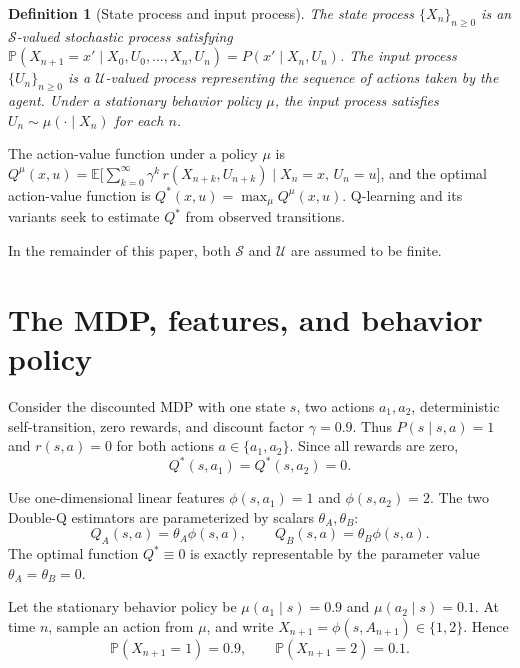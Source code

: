 \documentclass[11pt]{article}
\newtheorem{definition}{Definition}
\begin{document}
\begin{definition}[State process and input process]
The \textit{state process} $\{X_n\}_{n \geq 0}$ is an $\mathcal{S}$-valued stochastic process satisfying $\mathbb{P}(X_{n+1} = x' \mid X_0, U_0, \ldots, X_n, U_n) = P(x' \mid X_n, U_n)$. The \textit{input process} $\{U_n\}_{n \geq 0}$ is a $\mathcal{U}$-valued process representing the sequence of actions taken by the agent. Under a stationary behavior policy $\mu$, the input process satisfies $U_n \sim \mu(\cdot \mid X_n)$ for each $n$.
\end{definition}

The action-value function under a policy $\mu$ is $Q^\mu(x,u) = \mathbb{E}\bigl[\sum_{k=0}^{\infty} \gamma^k\, r(X_{n+k}, U_{n+k}) \mid X_n = x,\, U_n = u\bigr]$, and the optimal action-value function is $Q^*(x,u) = \max_\mu Q^\mu(x,u)$. Q-learning and its variants seek to estimate $Q^*$ from observed transitions.

In the remainder of this paper, both $\mathcal{S}$ and $\mathcal{U}$ are assumed to be finite.

\section{The MDP, features, and behavior policy}

Consider the discounted MDP with one state $s$, two actions $a_1, a_2$, deterministic self-transition, zero rewards, and discount factor $\gamma = 0.9$. Thus $P(s \mid s,a) = 1$ and $r(s,a) = 0$ for both actions $a \in \{a_1, a_2\}$. Since all rewards are zero,
\begin{equation}\label{eq:qstar}
Q^*(s,a_1) = Q^*(s,a_2) = 0.
\end{equation}

Use one-dimensional linear features $\phi(s,a_1) = 1$ and $\phi(s,a_2) = 2$. The two Double-Q estimators are parameterized by scalars $\theta_A, \theta_B$:
\begin{equation}\label{eq:qa-qb}
Q_A(s,a) = \theta_A \phi(s,a), \qquad Q_B(s,a) = \theta_B \phi(s,a).
\end{equation}
The optimal function $Q^* \equiv 0$ is exactly representable by the parameter value $\theta_A = \theta_B = 0$.

Let the stationary behavior policy be $\mu(a_1 \mid s) = 0.9$ and $\mu(a_2 \mid s) = 0.1$. At time $n$, sample an action from $\mu$, and write $X_{n+1} = \phi(s, A_{n+1}) \in \{1, 2\}$. Hence
\begin{equation}\label{eq:feature-dist}
\mathbb{P}(X_{n+1} = 1) = 0.9, \qquad \mathbb{P}(X_{n+1} = 2) = 0.1.
\end{equation}
\end{document}
